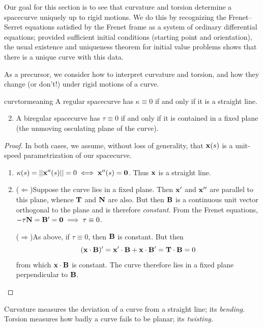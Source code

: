 Our goal for this section is to see that curvature and torsion determine a spacecurve uniquely up to rigid motions. We do this by recognizing the Frenet--Serret equations satisfied by the Frenet frame as a system of ordinary differential equations; provided sufficient initial conditions (starting point and orientation), the usual existence and uniqueness theorem for initial value problems shows that there is a unique curve with this data.\medbreak

As a precursor, we consider how to interpret curvature and torsion, and how they change (or don't!) under rigid motions of a curve.

\begin{thm}{}{curvtormeaning}
	\exstart A regular spacecurve has $\kappa\equiv 0$ if and only if it is a straight line.
	\begin{enumerate}\setcounter{enumi}{1}
	  \item A biregular spacecurve has $\tau\equiv 0$ if and only if it is contained in a fixed plane (the unmoving osculating plane of the curve).
	\end{enumerate}
\end{thm}

\begin{proof}
	In both cases, we assume, without loss of generality, that ${\mathbf{x}}(s)$ is a unit-speed parametrization of our spacecurve.
	\begin{enumerate}
	  \item $\kappa(s)=\left| \left| {\mathbf{x}}''(s)\right|\right|=0\iff{\mathbf{x}}''(s)=\mathbf{0}$. Thus ${\mathbf{x}}$ is a straight line.
	  \item ($\Leftarrow$)\quad Suppose the curve lies in a fixed plane. Then ${\mathbf{x}}'$ and ${\mathbf{x}}''$ are parallel to this plane, whence ${\mathbf{T}}$ and ${\mathbf{N}}$ are also. But then ${\mathbf{B}}$ is a continuous unit vector orthogonal to the plane and is therefore \emph{constant.} From the Frenet equations, $-\tau{\mathbf{N}}={\mathbf{B}}'=\mathbf{0}\implies \tau\equiv 0$.\par
	  ($\Rightarrow$)\quad As above, if $\tau\equiv 0$, then ${\mathbf{B}}$ is constant. But then
	  \[
	  	({\mathbf{x}}\cdot{\mathbf{B}})'={\mathbf{x}}'\cdot{\mathbf{B}}+{\mathbf{x}}\cdot{\mathbf{B}}'={\mathbf{T}}\cdot{\mathbf{B}}=0
	  \]
	  from which ${\mathbf{x}}\cdot{\mathbf{B}}$ is constant. The curve therefore lies in a fixed plane perpendicular to ${\mathbf{B}}$.\qedhere
	\end{enumerate}
\end{proof}


Curvature measures the deviation of a curve from a straight line; its \emph{bending.} Torsion measures how badly a curve fails to be planar; its \emph{twisting.}\smallbreak

